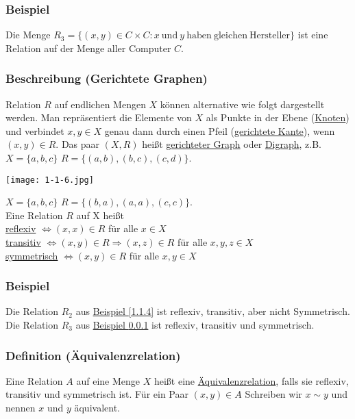 \subsubsection{Beispiel}
\label{1.1.5}
Die Menge $R_3=\{(x,y)\in C\times C:x\ \mathrm{und\ } y \mathrm{\ haben\ gleichen\ Hersteller}\}$ ist eine Relation auf der Menge aller Computer $C$.
\subsubsection{Beschreibung (Gerichtete Graphen)}
Relation $R$ auf endlichen Mengen $X$ können alternative wie folgt dargestellt werden.  Man repräsen\-tiert die Elemente von $X$ als Punkte in der Ebene (\underline{Knoten}) und verbindet $x,y\in X$ genau dann durch einen Pfeil (\underline{gerichtete Kante}), wenn $(x,y)\in R$.  Das paar $(X,R)$ heißt \underline{gerichteter Graph} oder \underline{Digraph}, z.B. $X=\{a,b,c\}$ $R=\{(a,b),(b,c),(c,d)\}$.\\
\begin{center}
\texttt{[image: 1-1-6.jpg]}
\end{center}
$X=\{a,b,c\}$ $R=\{(b,a),(a,a),(c,c)\}$. \\
Eine Relation $R$ auf X heißt \\
\underline{reflexiv} $\Leftrightarrow (x,x)\in R$ für alle $x\in X$ \\
\underline{transitiv} $\Leftrightarrow (x,y)\in R \Rightarrow (x,z) \in R$ für alle $x,y,z\in X$\\
\underline{symmetrisch} $\Leftrightarrow (x,y)\in R$ für alle $x,y\in X$
\subsubsection{Beispiel}
\label{gerichtete}
Die Relation $R_2$ aus \hyperref[1.1.4]{Beispiel \ref*{1.1.4}} ist reflexiv, transitiv, aber nicht Symmetrisch.  Die Relation $R_3$ aus \hyperref[1.1.5]{Beispiel \ref*{1.1.5}} ist reflexiv, transitiv und symmetrisch.
\subsubsection{Definition (Äquivalenzrelation)}
Eine Relation $A$ auf eine Menge $X$ heißt eine \underline{Äquivalenzrelation}, falls sie reflexiv, transitiv und symmetrisch ist.  Für ein Paar $(x,y)\in A$  Schreiben wir $x\mathtt{\sim} y$ und nennen $x$ und $y$ äquivalent.
